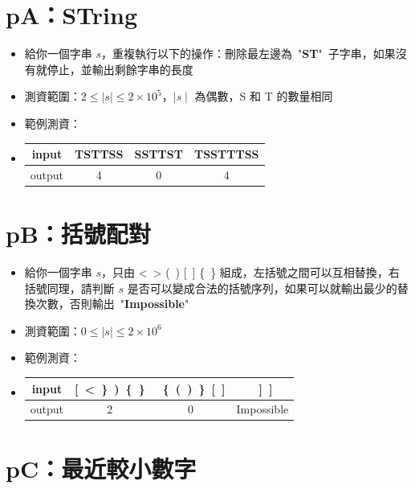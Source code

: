\documentclass[12pt]{article}
\begin{document}
\section*{pA：STring}

\begin{itemize}[label={}, itemsep=0pt]
    \item 給你一個字串 $s$，重複執行以下的操作：刪除最左邊為\ "\textbf{ST}"\ 子字串，如果沒有就停止，並輸出剩餘字串的長度
    \item 測資範圍：$2 \leq \mid s \mid \leq 2 \times 10^5$，$\mid s \mid$ 為偶數，S 和 T 的數量相同
    \item 範例測資：
    \item 
    \centering
    \begin{tabular}{|c|c|c|c|}
        \hline
        input  & TSTTSS & SSTTST & TSSTTTSS \\ \hline
        output & 4      & 0      & 4        \\ \hline
    \end{tabular}
\end{itemize}

\section*{pB：括號配對}

\begin{itemize}[label={}, itemsep=0pt]
    \item 給你一個字串 $s$，只由 <\ > (\ ) [\ ] \{\ \} 組成，左括號之間可以互相替換，右括號同理，請判斷 $s$ 是否可以變成合法的括號序列，如果可以就輸出最少的替換次數，否則輸出\ "\textbf{Impossible}"
    \item 測資範圍：$0 \leq \mid s \mid \leq 2 \times 10^6$
    \item 範例測資：
    \item
    \centering
    \begin{tabular}{|c|c|c|c|}
        \hline
        input  & [\ <\ \}\ )\ \{\ \} & \ \{\ (\ )\ \}\ [\ ] & \ ]\ ]     \\ \hline
        output & 2                   & 0                    & Impossible \\ \hline
    \end{tabular}
\end{itemize}

\section*{pC：最近較小數字}
\end{document}

